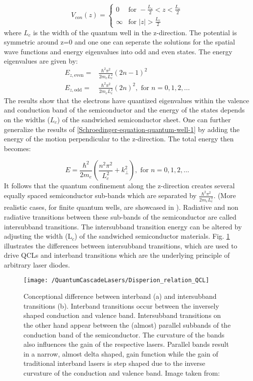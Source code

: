 \[ V_{con}(z) =  \left\{
\begin{array}{ll}
0  & \text{for } -\frac{L_c}{2}< z < \frac{L_c}{2} \\
\infty & \text{for } |z| > \frac{L_c}{2}
\end{array} 
\right. \]
where $L_c$ is the width of the quantum well in the z-direction. The potential is symmetric around z=0 and one one can seperate the solutions for the spatial wave functions and energy eigenvalues into odd and even states. The  energy eigenvalues are given by:
\begin{align}
	E_{z,\text{even}} =& \frac{\hbar^2 \pi^2}{2m_e L_c^2} (2n-1)^2\nonumber\\
	E_{z,\text{odd}} =& \frac{\hbar^2 \pi^2}{2m_e L_c^2} (2n)^2, \text{ for }  n = 0,1,2,...
	\label{Schroedinger-equation-quantum-well-1}
\end{align}
The results show that the electrons have quantized eigenvalues within the valence and conduction band of the semiconductor and the energy of the states depends on the widths ($L_c$) of the sandwiched semiconductor sheet. One can further generalize the results of \ref{Schroedinger-equation-quantum-well-1} by adding the energy of the motion perpendicular to the z-direction. The total energy then becomes:


\begin{equation}
	E = \frac{\hbar^2}{2m_e}\left(\frac{n^2\pi^2}{L_c^2}+ k^2_{\perp}\right), \text{ for }  n = 0,1,2,...
	\label{Schroedinger-equation-quantum-well-energy-eigenvalues-2}
\end{equation}
It follows that the quantum confinement along the z-direction creates several equally spaced semiconductor sub-bands which are separated by $\frac{\hbar^2\pi^2}{2m_e L^2_c}$. (More realistic cases, for finite quantum wells, are showcased in \cite{Haug2009}). Radiative and non radiative transitions between these sub-bands of the semiconductor are called intersubband transitions. The intersubband transition energy can be altered by adjusting the width (L$_c$) of the sandwiched semiconductor materials. Fig. \ref{figure:QCL-dispersion-relation} illustrates the differences between intersubband transitions, which are used to drive QCLs and interband transitions which are the underlying principle of arbitrary laser diodes. 
\newpage
\begin{figure}[ht]
	\centering
	\texttt{[image: /QuantumCascadeLasers/Disperion\_relation\_QCL]}
	\caption{Conceptional difference between interband (a) and intersubband transitions (b). Interband transitions occur between the inversely shaped conduction and valence band. Intersubband transitions on the other hand appear between the (almost) parallel subbands of the conduction band of the semiconductor. The curvature of the bands also influences the gain of the respective lasers. Parallel bands result in a narrow, almost delta shaped, gain function while the gain of traditional interband lasers is step shaped due to the inverse curvature of the conduction and valence band. Image taken from: \cite{Faist2018}}
	\label{figure:QCL-dispersion-relation}
\end{figure}

